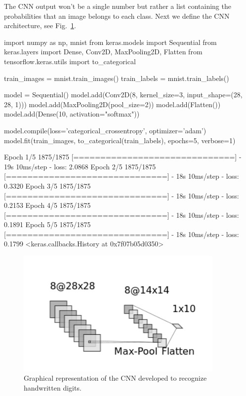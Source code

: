 The CNN output won't be a single number but rather a list containing the probabilities that an image belongs to each class. Next we define the CNN architecture, see Fig.~\ref{fig:cnn2d}.

\begin{ipython}
import numpy as np, mnist
from keras.models import Sequential
from keras.layers import Dense, Conv2D, MaxPooling2D, Flatten
from tensorflow.keras.utils import to_categorical

train_images = mnist.train_images() 
train_labels = mnist.train_labels() 

model = Sequential()
model.add(Conv2D(8, kernel_size=3, input_shape=(28, 28, 1)))
model.add(MaxPooling2D(pool_size=2))
model.add(Flatten())
model.add(Dense(10, activation="softmax"))

model.compile(loss='categorical_crossentropy', optimizer='adam')
model.fit(train_images, to_categorical(train_labels), epochs=5, verbose=1)
\end{ipython}
\begin{ioutput}
Epoch 1/5
1875/1875 [==============================] - 19s 10ms/step - loss: 2.0868
Epoch 2/5
1875/1875 [==============================] - 18s 10ms/step - loss: 0.3320
Epoch 3/5
1875/1875 [==============================] - 18s 10ms/step - loss: 0.2153
Epoch 4/5
1875/1875 [==============================] - 18s 10ms/step - loss: 0.1891
Epoch 5/5
1875/1875 [==============================] - 18s 10ms/step - loss: 0.1799
<keras.callbacks.History at 0x7f07b05d0350>
\end{ioutput}

\begin{figure}[htb]
\centering
\includegraphics[width=0.9\textwidth]{figures/cnn_2d.png}
\caption{Graphical representation of the CNN developed to recognize handwritten digits.}
\label{fig:cnn2d}
\end{figure}

